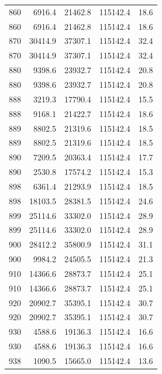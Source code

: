 \begin{longtable}{rrrrr}
    860 & \num{6916.4} & \num{21462.8} & \num{115142.4} & 18.6 \\
    860 & \num{6916.4} & \num{21462.8} & \num{115142.4} & 18.6 \\
    870 & \num{30414.9} & \num{37307.1} & \num{115142.4} & 32.4 \\
    870 & \num{30414.9} & \num{37307.1} & \num{115142.4} & 32.4 \\
    880 & \num{9398.6} & \num{23932.7} & \num{115142.4} & 20.8 \\
    880 & \num{9398.6} & \num{23932.7} & \num{115142.4} & 20.8 \\
    888 & \num{3219.3} & \num{17790.4} & \num{115142.4} & 15.5 \\
    888 & \num{9168.1} & \num{21422.7} & \num{115142.4} & 18.6 \\
    889 & \num{8802.5} & \num{21319.6} & \num{115142.4} & 18.5 \\
    889 & \num{8802.5} & \num{21319.6} & \num{115142.4} & 18.5 \\
    890 & \num{7209.5} & \num{20363.4} & \num{115142.4} & 17.7 \\
    890 & \num{2530.8} & \num{17574.2} & \num{115142.4} & 15.3 \\
    898 & \num{6361.4} & \num{21293.9} & \num{115142.4} & 18.5 \\
    898 & \num{18103.5} & \num{28381.5} & \num{115142.4} & 24.6 \\
    899 & \num{25114.6} & \num{33302.0} & \num{115142.4} & 28.9 \\
    899 & \num{25114.6} & \num{33302.0} & \num{115142.4} & 28.9 \\
    900 & \num{28412.2} & \num{35800.9} & \num{115142.4} & 31.1 \\
    900 & \num{9984.2} & \num{24505.5} & \num{115142.4} & 21.3 \\
    910 & \num{14366.6} & \num{28873.7} & \num{115142.4} & 25.1 \\
    910 & \num{14366.6} & \num{28873.7} & \num{115142.4} & 25.1 \\
    920 & \num{20902.7} & \num{35395.1} & \num{115142.4} & 30.7 \\
    920 & \num{20902.7} & \num{35395.1} & \num{115142.4} & 30.7 \\
    930 & \num{4588.6} & \num{19136.3} & \num{115142.4} & 16.6 \\
    930 & \num{4588.6} & \num{19136.3} & \num{115142.4} & 16.6 \\
    938 & \num{1090.5} & \num{15665.0} & \num{115142.4} & 13.6 \\

\end{longtable}
